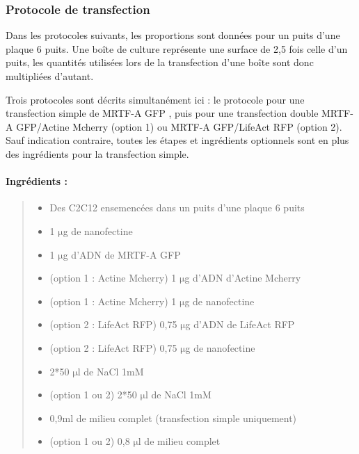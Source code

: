 \documentclass{report}
\newcommand{\micro}{$\mathrm{\mu}$}
\begin{document}
	 
	
	\subsubsection{Protocole de transfection}
	
	Dans les protocoles suivants, les proportions sont données pour un puits d'une plaque 6 puits. Une boîte de culture représente une surface de 2,5 fois celle d'un puits, les quantités utilisées lors de la transfection d'une boîte sont donc multipliées d'autant.
	
	Trois protocoles sont décrits simultanément ici : le protocole pour une transfection simple de MRTF-A GFP , puis pour une transfection double MRTF-A GFP/Actine Mcherry (option 1) ou MRTF-A GFP/LifeAct RFP (option 2). Sauf indication contraire, toutes les étapes et ingrédients optionnels sont en plus des ingrédients pour la transfection simple.
	
\paragraph{Ingrédients :}
\begin{quote}

	\begin{itemize}
	\item Des C2C12 ensemencées dans un puits d'une plaque 6 puits
	\item 1 \micro g de nanofectine 
	\item 1 \micro g d'ADN de MRTF-A GFP
	\item (option 1 : Actine Mcherry) 1 \micro g d'ADN d'Actine Mcherry
	\item (option 1 : Actine Mcherry) 1 \micro g de nanofectine
	\item (option 2 : LifeAct RFP) 0,75 \micro g d'ADN de LifeAct RFP
	\item (option 2 : LifeAct RFP) 0,75 \micro g de nanofectine
	\item 2*50 \micro l de NaCl 1mM
	\item (option 1 ou 2) 2*50 \micro l de NaCl 1mM
	\item 0,9ml de milieu complet (transfection simple uniquement)
	\item (option 1 ou 2) 0,8 \micro l de milieu complet
	\end{itemize}
\end{quote}
\end{document}
